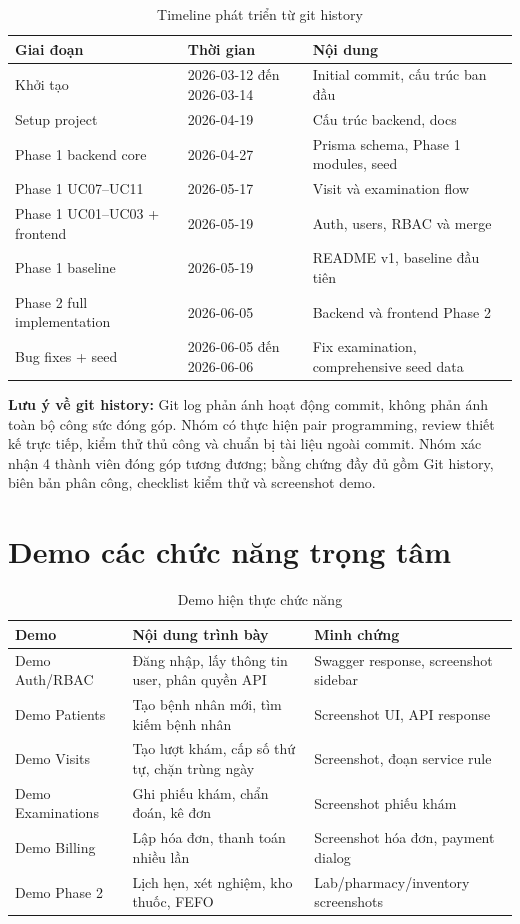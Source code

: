 \begin{longtable}{|p{3.2cm}|p{3cm}|p{7.5cm}|}
\caption{Timeline phát triển từ git history}\\
\hline
\textbf{Giai đoạn} & \textbf{Thời gian} & \textbf{Nội dung} \\
\hline
Khởi tạo & 2026-03-12 đến 2026-03-14 & Initial commit, cấu trúc ban đầu \\
\hline
Setup project & 2026-04-19 & Cấu trúc backend, docs \\
\hline
Phase 1 backend core & 2026-04-27 & Prisma schema, Phase 1 modules, seed \\
\hline
Phase 1 UC07--UC11 & 2026-05-17 & Visit và examination flow \\
\hline
Phase 1 UC01--UC03 + frontend & 2026-05-19 & Auth, users, RBAC và merge \\
\hline
Phase 1 baseline & 2026-05-19 & README v1, baseline đầu tiên \\
\hline
Phase 2 full implementation & 2026-06-05 & Backend và frontend Phase 2 \\
\hline
Bug fixes + seed & 2026-06-05 đến 2026-06-06 & Fix examination, comprehensive seed data \\
\hline
\end{longtable}

\textbf{Lưu ý về git history:} Git log phản ánh hoạt động commit, không phản ánh toàn bộ công sức đóng góp. Nhóm có thực hiện pair programming, review thiết kế trực tiếp, kiểm thử thủ công và chuẩn bị tài liệu ngoài commit. Nhóm xác nhận 4 thành viên đóng góp tương đương; bằng chứng đầy đủ gồm Git history, biên bản phân công, checklist kiểm thử và screenshot demo.

\section{Demo các chức năng trọng tâm}

\begin{longtable}{|p{3.2cm}|p{5.5cm}|p{5.5cm}|}
\caption{Demo hiện thực chức năng}\\
\hline
\textbf{Demo} & \textbf{Nội dung trình bày} & \textbf{Minh chứng } \\
\hline
Demo Auth/RBAC & Đăng nhập, lấy thông tin user, phân quyền API & Swagger response, screenshot sidebar \\
\hline
Demo Patients & Tạo bệnh nhân mới, tìm kiếm bệnh nhân & Screenshot UI, API response \\
\hline
Demo Visits & Tạo lượt khám, cấp số thứ tự, chặn trùng ngày & Screenshot, đoạn service rule \\
\hline
Demo Examinations & Ghi phiếu khám, chẩn đoán, kê đơn & Screenshot phiếu khám \\
\hline
Demo Billing & Lập hóa đơn, thanh toán nhiều lần & Screenshot hóa đơn, payment dialog \\
\hline
Demo Phase 2 & Lịch hẹn, xét nghiệm, kho thuốc, FEFO & Lab/pharmacy/inventory screenshots \\
\hline
\end{longtable}

